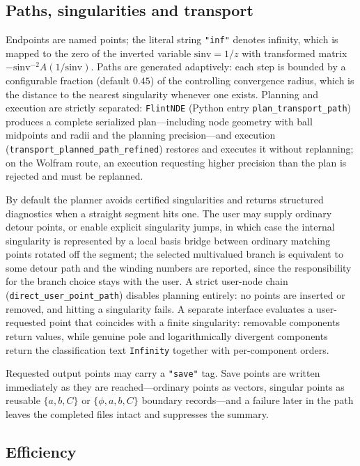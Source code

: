 \documentclass[11pt,a4paper]{article}
\begin{document}
\subsection{Paths, singularities and transport}
\label{sec:paths}

Endpoints are named points; the literal string \texttt{"inf"} denotes infinity, which is
mapped to the zero of the inverted variable $\mathrm{sinv}=1/z$ with transformed matrix
$-\mathrm{sinv}^{-2}A(1/\mathrm{sinv})$. Paths are generated adaptively: each step is
bounded by a configurable fraction (default $0.45$) of the controlling convergence radius,
which is the distance to the nearest singularity whenever one exists. Planning and
execution are strictly separated: \texttt{FlintNDE} (Python entry
\texttt{plan\_transport\_path}) produces a complete serialized plan---including node
geometry with ball midpoints and radii and the planning precision---and execution
(\texttt{transport\_planned\_path\_refined}) restores and executes it without replanning;
on the Wolfram route, an execution requesting higher precision than the plan is rejected
and must be replanned.

By default the planner avoids certified singularities and returns structured diagnostics
when a straight segment hits one. The user may supply ordinary detour points, or enable
explicit singularity jumps, in which case the internal singularity is represented by a
local basis bridge between ordinary matching points rotated off the segment; the selected
multivalued branch is equivalent to some detour path and the winding numbers are reported,
since the responsibility for the branch choice stays with the user. A strict user-node
chain (\texttt{direct\_user\_point\_path}) disables planning entirely: no points are
inserted or removed, and hitting a singularity fails. A separate interface evaluates a
user-requested point that coincides with a finite singularity: removable components
return values, while genuine pole and logarithmically divergent components return the
classification text \texttt{Infinity} together with per-component orders.

Requested output points may carry a \texttt{"save"} tag. Save points are written
immediately as they are reached---ordinary points as vectors, singular points as reusable
$\{a,b,C\}$ or $\{\phi,a,b,C\}$ boundary records---and a failure later in the path leaves
the completed files intact and suppresses the summary.

\subsection{Efficiency}
\label{sec:efficiency}
\end{document}
